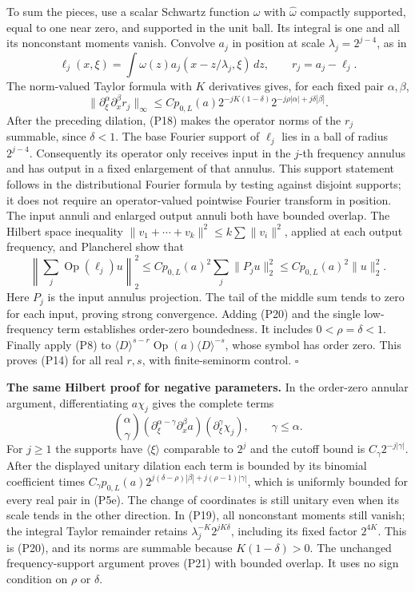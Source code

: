 \documentclass[
  11pt,
]{article}
\begin{document}
To sum the pieces, use a scalar Schwartz function \(\omega\) with
\(\widehat\omega\) compactly supported, equal to one near zero, and
supported in the unit ball. Its integral is one and all its nonconstant
moments vanish. Convolve \(a_j\) in position at scale
\(\lambda_j=2^{j-4}\), as in \[
 \ell_j(x,\xi)=\int\omega(z)a_j(x-z/\lambda_j,\xi)\,dz,
 \qquad r_j=a_j-\ell_j.
\tag{P19}
\] The norm-valued Taylor formula with \(K\) derivatives gives, for each
fixed pair \(\alpha,\beta\), \[
 \|\partial_\xi^\alpha\partial_x^\beta r_j\|_\infty
 \leq Cp_{0,L}(a)2^{-jK(1-\delta)}
       2^{-j\rho|\alpha|+j\delta|\beta|}.
\tag{P20}
\] After the preceding dilation, (P18) makes the operator norms of the
\(r_j\) summable, since \(\delta<1\). The base Fourier support of
\(\ell_j\) lies in a ball of radius \(2^{j-4}\). Consequently its
operator only receives input in the \(j\)-th frequency annulus and has
output in a fixed enlargement of that annulus. This support statement
follows in the distributional Fourier formula by testing against
disjoint supports; it does not require an operator-valued pointwise
Fourier transform in position. The input annuli and enlarged output
annuli both have bounded overlap. The Hilbert space inequality
\(\|v_1+\cdots+v_k\|^2\leq k\sum\|v_i\|^2\), applied at each output
frequency, and Plancherel show that \[
 \left\|\sum_j\operatorname{Op}(\ell_j)u\right\|_2^2
 \leq Cp_{0,L}(a)^2\sum_j\|P_ju\|_2^2
 \leq Cp_{0,L}(a)^2\|u\|_2^2.
\tag{P21}
\] Here \(P_j\) is the input annulus projection. The tail of the middle
sum tends to zero for each input, proving strong convergence. Adding
(P20) and the single low-frequency term establishes order-zero
boundedness. It includes \(0<\rho=\delta<1\). Finally apply (P8) to
\(\langle D\rangle^{s-r}\operatorname{Op}(a)\langle D\rangle^{-s}\),
whose symbol has order zero. This proves (P14) for all real \(r,s\),
with finite-seminorm control. \(\square\)

\textbf{The same Hilbert proof for negative parameters.} In the
order-zero annular argument, differentiating \(a\chi_j\) gives the
complete terms \[
 {\alpha\choose\gamma}
 (\partial_\xi^{\alpha-\gamma}\partial_x^\beta a)
 (\partial_\xi^\gamma\chi_j),\qquad \gamma\leq\alpha.
 \tag{P21e}
\] For \(j\geq1\) the supports have \(\langle\xi\rangle\) comparable to
\(2^j\) and the cutoff bound is \(C_\gamma2^{-j|\gamma|}\). After the
displayed unitary dilation each term is bounded by its binomial
coefficient times
\(C_\gamma p_{0,L}(a)2^{j(\delta-\rho)|\beta|+j(\rho-1)|\gamma|}\),
which is uniformly bounded for every real pair in (P5e). The change of
coordinates is still unitary even when its scale tends in the other
direction. In (P19), all nonconstant moments still vanish; the integral
Taylor remainder retains \(\lambda_j^{-K}2^{jK\delta}\), including its
fixed factor \(2^{4K}\). This is (P20), and its norms are summable
because \(K(1-\delta)>0\). The unchanged frequency-support argument
proves (P21) with bounded overlap. It uses no sign condition on \(\rho\)
or \(\delta\).
\end{document}
